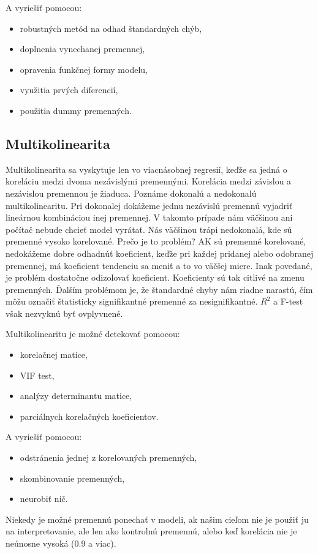 A vyriešiť pomocou:
\begin{itemize}
\tightlist
\item
  robustných metód na odhad štandardných chýb,
\item
  doplnenia vynechanej premennej,
\item
  opravenia funkčnej formy modelu,
\item
  využitia prvých diferencií,
\item
  použitia dummy premenných.
\end{itemize}

\hypertarget{multikolinearita}{%
\subsection{Multikolinearita}\label{multikolinearita}}

Multikolinearita sa vyskytuje len vo viacnásobnej regresií, keďže sa
jedná o koreláciu medzi dvoma nezávislými premennými. Korelácia medzi
závislou a nezávislou premennou je žiaduca. Poznáme dokonalú a
nedokonalú multikolinearitu. Pri dokonalej dokážeme jednu nezávislú
premennú vyjadriť lineárnou kombináciou inej premennej. V takomto
prípade nám väčšinou ani počítač nebude chcieť model vyrátať. Nás
väčšinou trápi nedokonalá, kde sú premenné vysoko korelované. Prečo je
to problém? AK sú premenné korelované, nedokážeme dobre odhadnúť
koeficient, keďže pri každej pridanej alebo odobranej premennej, má
koeficient tendenciu sa meniť a to vo väčšej miere. Inak povedané, je
problém dostatočne odizolovať koeficient. Koeficienty sú tak citlivé na
zmenu premenných. Ďalším problémom je, že štandardné chyby nám riadne
narastú, čím môžu označiť štatisticky signifikantné premenné za
nesignifikantné. \(R^2\) a F-test však nezvyknú byť ovplyvnené.

Multikolinearitu je možné detekovať pomocou:

\begin{itemize}
\tightlist
\item
  korelačnej matice,
\item
  VIF test,
\item
  analýzy determinantu matice,
\item
  parciálnych korelačných koeficientov.
\end{itemize}

A vyriešiť pomocou:

\begin{itemize}
\tightlist
\item
  odstránenia jednej z korelovaných premenných,
\item
  skombinovanie premenných,
\item
  neurobiť nič.
\end{itemize}

Niekedy je možné premennú ponechať v modeli, ak našim cieľom nie je
použiť ju na interpretovanie, ale len ako kontrolnú premennú, alebo keď
korelácia nie je neúnosne vysoká (0.9 a viac).




